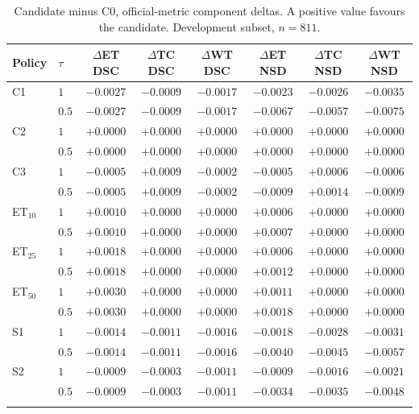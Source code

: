 \documentclass[runningheads]{llncs}
\begin{document}
\begin{table}[!htbp]\centering\small
\caption{Candidate minus C0, official-metric component deltas. A positive value favours the candidate. Development subset, $n=811$.}
\begin{tabular}{@{}llcccccc@{}}
\toprule
Policy & $\tau$ & $\Delta$ET DSC & $\Delta$TC DSC & $\Delta$WT DSC & $\Delta$ET NSD & $\Delta$TC NSD & $\Delta$WT NSD \\
\midrule
C1 & $1$ & $-0.0027$ & $-0.0009$ & $-0.0017$ & $-0.0023$ & $-0.0026$ & $-0.0035$ \\
 & $0.5$ & $-0.0027$ & $-0.0009$ & $-0.0017$ & $-0.0067$ & $-0.0057$ & $-0.0075$ \\
\addlinespace[2pt]
C2 & $1$ & $+0.0000$ & $+0.0000$ & $+0.0000$ & $+0.0000$ & $+0.0000$ & $+0.0000$ \\
 & $0.5$ & $+0.0000$ & $+0.0000$ & $+0.0000$ & $+0.0000$ & $+0.0000$ & $+0.0000$ \\
\addlinespace[2pt]
C3 & $1$ & $-0.0005$ & $+0.0009$ & $-0.0002$ & $-0.0005$ & $+0.0006$ & $-0.0006$ \\
 & $0.5$ & $-0.0005$ & $+0.0009$ & $-0.0002$ & $-0.0009$ & $+0.0014$ & $-0.0009$ \\
\addlinespace[2pt]
ET$_{10}$ & $1$ & $+0.0010$ & $+0.0000$ & $+0.0000$ & $+0.0006$ & $+0.0000$ & $+0.0000$ \\
 & $0.5$ & $+0.0010$ & $+0.0000$ & $+0.0000$ & $+0.0007$ & $+0.0000$ & $+0.0000$ \\
\addlinespace[2pt]
ET$_{25}$ & $1$ & $+0.0018$ & $+0.0000$ & $+0.0000$ & $+0.0006$ & $+0.0000$ & $+0.0000$ \\
 & $0.5$ & $+0.0018$ & $+0.0000$ & $+0.0000$ & $+0.0012$ & $+0.0000$ & $+0.0000$ \\
\addlinespace[2pt]
ET$_{50}$ & $1$ & $+0.0030$ & $+0.0000$ & $+0.0000$ & $+0.0011$ & $+0.0000$ & $+0.0000$ \\
 & $0.5$ & $+0.0030$ & $+0.0000$ & $+0.0000$ & $+0.0018$ & $+0.0000$ & $+0.0000$ \\
\addlinespace[2pt]
S1 & $1$ & $-0.0014$ & $-0.0011$ & $-0.0016$ & $-0.0018$ & $-0.0028$ & $-0.0031$ \\
 & $0.5$ & $-0.0014$ & $-0.0011$ & $-0.0016$ & $-0.0040$ & $-0.0045$ & $-0.0057$ \\
\addlinespace[2pt]
S2 & $1$ & $-0.0009$ & $-0.0003$ & $-0.0011$ & $-0.0009$ & $-0.0016$ & $-0.0021$ \\
 & $0.5$ & $-0.0009$ & $-0.0003$ & $-0.0011$ & $-0.0034$ & $-0.0035$ & $-0.0048$ \\
\addlinespace[2pt]
\bottomrule
\end{tabular}
\end{table}
\end{document}
